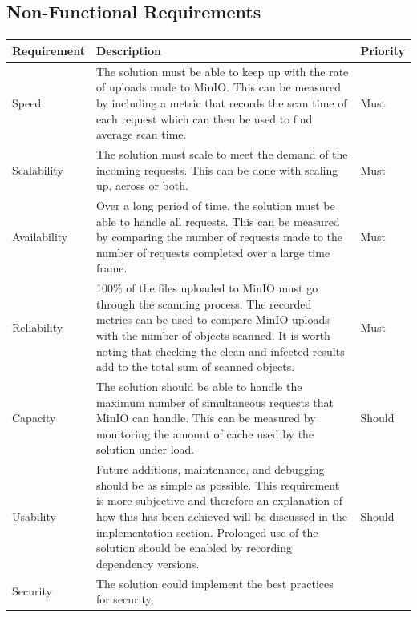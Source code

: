 \documentclass[12pt, conference, final, a4paper, onecolumn, compsoc]{IEEEtran}
\begin{document}
\subsection{Non-Functional Requirements}
\paragraph{}

\begin{table}[H]
  \centering
  \begin{tabular}{|l|p{}|l|}
    \hline
    \textbf{Requirement} & \textbf{Description} & \textbf{Priority} \\ \hline
    Speed & The solution must be able to keep up with the rate of uploads made
            to MinIO. This can be measured by including a metric that records
            the scan time of each request which can then be used to find average
            scan time. & Must \\ \hline
    Scalability & The solution must scale to meet the demand of the incoming
                  requests. This can be done with scaling up, across or both.  & Must \\ \hline
    Availability & Over a long period of time, the solution must be able to handle all requests. This can be measured by comparing the number of requests made to the number of requests completed over a large time frame. & Must \\ \hline
    Reliability & 100\% of the files uploaded to MinIO must go through the scanning process. The recorded metrics can be used to compare MinIO uploads with the number of objects scanned. It is worth noting that checking the clean and infected results add to the total sum of scanned objects. & Must \\ \hline
    Capacity & The solution should be able to handle the maximum number of simultaneous requests that MinIO can handle. This can be measured by monitoring the amount of cache used by the solution under load. & Should \\ \hline
    Usability & Future additions, maintenance, and debugging should be as simple
                as possible. This requirement is more subjective and therefore
                an explanation of how this has been achieved will be discussed
                in the implementation section. Prolonged use of the solution
                should be enabled by recording dependency versions. & Should \\ \hline
    Security & The solution could implement the best practices for security,

\end{tabular}
\end{table}
\end{document}
